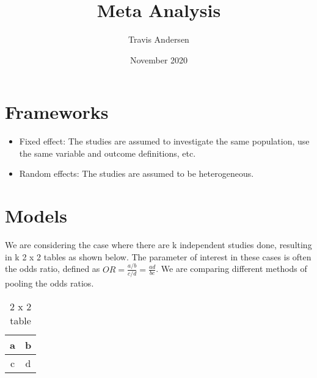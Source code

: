\documentclass{article}
\title{Meta Analysis}
\author{Travis Andersen }
\date{November 2020}
\begin{document}
\maketitle

\section{Frameworks}

\begin{itemize}

    \item Fixed effect: The studies are assumed to investigate the same population, use the same variable and outcome definitions, etc.

    \item Random effects: The studies are assumed to be heterogeneous.  

\end{itemize}

\section{Models}

We are considering the case where there are k independent studies done, resulting in k 2 x 2 tables as shown below. The parameter of interest in these cases is often the odds ratio, defined as $OR = \frac{a/b}{c/d} = \frac{ad}{bc}$. We are comparing different methods of pooling the odds ratios.
\begin{table}[h!]
\centering
    \begin{tabular}{|c|c|}
        \hline
        a & b \\
        \hline
        c & d \\
        \hline
    \end{tabular}
\caption{2 x 2 table}
\end{table}
\end{document}
